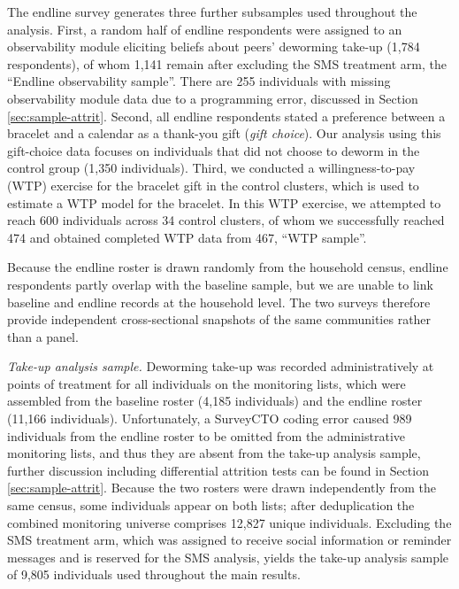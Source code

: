 The endline survey generates three further subsamples used throughout the
analysis.  First, a random half of endline respondents were assigned to an
observability module eliciting beliefs about peers' deworming take-up (1{,}784
respondents), of whom 1{,}141 remain after excluding the SMS treatment arm,
the ``Endline observability sample''. There are 255 individuals with
missing observability module data due to a programming error, discussed in Section \ref{sec:sample-attrit}.  Second, all endline respondents stated a preference between a
bracelet and a calendar as a thank-you gift (\emph{gift choice}).  Our analysis 
using this gift-choice data focuses on individuals that did not choose to deworm
in the control group (1{,}350 individuals). Third, we conducted a
willingness-to-pay (WTP) exercise for the bracelet gift in the control clusters,
which is used to estimate a WTP model for the bracelet.  In this WTP exercise,
we attempted to reach 600 individuals across 34 control clusters, of whom we
successfully reached 474 and obtained completed WTP data from 467, ``WTP sample''.


Because the endline roster is drawn randomly from the household census, endline
respondents partly overlap with the baseline sample, but we are unable to link
baseline and endline records at the household level.  The two surveys therefore
provide independent cross-sectional snapshots of the same communities rather
than a panel.


\emph{Take-up analysis sample.}
Deworming take-up was recorded administratively at points of treatment for all
individuals on the monitoring lists, which were assembled from the baseline
roster (4{,}185 individuals) and the endline roster (11{,}166 individuals). Unfortunately, 
a SurveyCTO coding error caused 989 individuals from the endline roster to be omitted from the 
administrative monitoring lists, and thus they are absent from the take-up analysis sample, further discussion including differential attrition tests can be found in Section \ref{sec:sample-attrit}.
Because the two rosters were drawn independently from the same census, some
individuals appear on both lists; after deduplication the combined monitoring
universe comprises 12{,}827 unique individuals.
Excluding the SMS treatment arm, which was assigned to receive social
information or reminder messages and is reserved for the SMS analysis, yields
the take-up analysis sample of 9{,}805 individuals used throughout the
main results.

  
